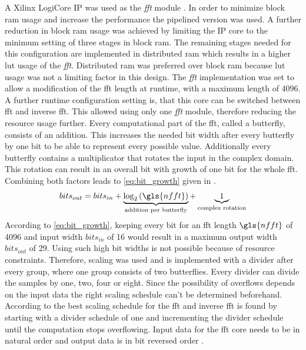 \documentclass[12pt,a4paper,parskip=full,abstract=true,BCOR=12mm,twoside,open=right]{scrreprt}
\def\device#1{\textit{#1}}
\begin{document}
A Xilinx LogiCore IP was used as the \device{fft} module \cite{xilinx_fft}. In
order to minimize block \gls{ram} usage and increase the performance the
pipelined version was used. A further reduction in block \gls{ram} usage was achieved
by limiting the IP core to the minimum setting of three stages in block \gls{ram}. The
remaining stages needed for this configuration are implemented in distributed \gls{ram} which
results in a higher \gls{lut} usage of the \device{fft}\cite{xilinx_fft,virtex5}. Distributed
\gls{ram} was preferred over block \gls{ram} because \gls{lut} usage was not a limiting factor
in this design. The \device{fft} implementation was set to allow a modification of the
\gls{fft} length at runtime, with a maximum length of 4096. A further runtime configuration
setting is, that this core can be switched between \gls{fft} and inverse \gls{fft}. This
allowed using only one \device{fft} module, therefore reducing the resource usage further. Every
computational part of the \gls{fft}, called a butterfly, consists of an addition. This
increases the needed bit width after every butterfly by one bit to be able to represent every
possible value. Additionally every butterfly contains a multiplicator that rotates the input
in the complex domain. This rotation can result in an overall bit with growth of one bit for the
whole \gls{fft}. Combining both factors leads to \cref{eq:bit_growth} given in \cite{xilinx_fft}.
\begin{equation}
    \label{eq:bit_growth}
    bits_{out} = bits_{in} + \underbrace{\log_2\left(\gls{nfft}\right)}_{\text{addition per butterfly}} + \underbrace{1}_{\text{complex rotation}}
\end{equation}
According to \cref{eq:bit_growth}, keeping every bit for an \gls{fft} length $\gls{nfft}$ of 4096
and input width $bits_{in}$ of \SI{16}{\bit} would result in a maximum output width $bits_{out}$
of \SI{29}{\bit}. Using such high bit widths is not possible because of resource constraints.
Therefore, scaling was used and is implemented with a divider after every group, where one group
consists of two butterflies. Every divider can divide the samples by one, two, four or eight.
Since the possibility of overflows depends on the input data the right scaling schedule can't
be determined beforehand. According to \cite{xilinx_fft} the best scaling schedule for the
\gls{fft} and inverse \gls{fft} is found by starting with a divider schedule of one and incrementing
the divider schedule until the computation stops overflowing. Input data for the \gls{fft} core
needs to be in natural order and output data is in bit reversed order \cite{xilinx_fft}.
\end{document}

